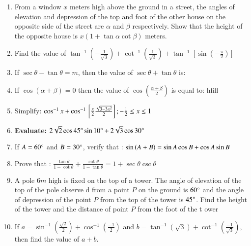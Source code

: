 \begin{enumerate}
\hfill{}\item From a window $x$ meters high above the ground in a street, the angles of elevation and depression of the top and foot of the other house on the opposite side of the street are $\alpha$ and $\beta$ respectively. Show that the height of the opposite house is $x(1 + \tan \alpha \cot \beta)$ meters.

\hfill{}
\item Find the value of $\tan^{-1} (-\frac{1}{\sqrt{3}}) + \cot^{-1}(\frac{1}{\sqrt{3}}) + \tan^{-1}[\sin(-\frac{\pi}{2})]$
	 \hfill{}
\item If $\sec\theta - \tan\theta = m$, then the value of $\sec\theta + \tan\theta$ is:

 \hfill{}\item If $\cos(\alpha + \beta) = 0$ then the value of $\cos\left(\frac{\alpha + \beta}{2}\right)$ is equal to:
hfill

\item Simplify: $\cos^{-1}x + \cos^{-1}{}\left[\frac{x}{2}{\frac{\sqrt{3-3x^2}}{2}}\right];-\frac{1}{2} \leq x \leq 1$

\hfill{}\item\textbf{ Evaluate:} $2\sqrt{2} \cos 45\degree \sin 10\degree + 2\sqrt{3} \cos 30\degree$

\hfill{}\item If  $A = 60\degree$ and  $B = 30\degree$, verify that : $\sin\left(A + B\right) = \sin A \cos B + \cos A \sin B$

\hfill{}\item Prove that : $\frac{\tan{\theta}}{1 - \cot{\theta}} + \frac{\cot{\theta}}{1 - \tan{\theta}} = 1 + \sec
{\theta}\csc{\theta}$
\hfill{}\item A pole $6m$ high is fixed on the top of a tower. The angle of elevation of the top of the pole observe
d from a point $P$ on the ground is $60\degree$ and the angle of depression of the point $P$ from the top of
 the tower is $45\degree$. Find the height of the tower and the distance of point $P$ from the foot of the t
ower
\hfill{}

\item If $ a = \sin^{-1}\left(\frac{\sqrt{2}}{2}\right) + \cos^{-1}\left(\frac{-1}{2}\right) $ and $ b = \tan^{-1}(\sqrt{3}) + \cot^{-1}\left(\frac{-1}{\sqrt{3}}\right) $, then find the value of $a + b$.






\end{enumerate}
